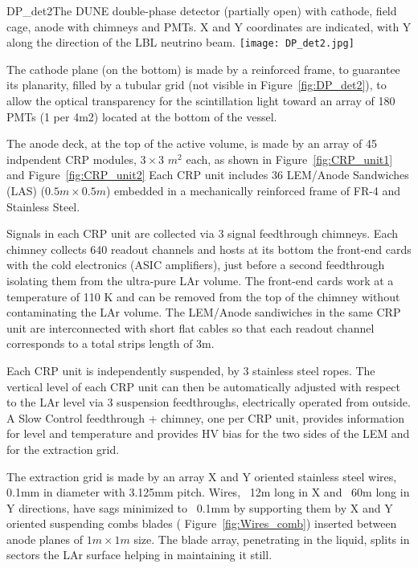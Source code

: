 \begin{cdrfigure}{DP_det2}{The DUNE double-phase detector (partially open) with cathode, field cage, anode with chimneys and PMTs. X and Y coordinates are indicated, with Y along the direction of the LBL neutrino beam.}
\texttt{[image: DP\_det2.jpg]}
\end{cdrfigure}

The cathode plane (on the bottom) is made by a reinforced frame, to guarantee its planarity, filled by a tubular grid (not visible in Figure~\ref{fig:DP_det2}), to allow the optical transparency for the scintillation light toward an array of 180 PMTs (1 per 4m2) located at the bottom of the vessel.

The anode deck, at the top of the active volume, is made by an array of 45 indpendent CRP modules, $3\times3$ $m^2$ each, as shown in Figure~\ref{fig:CRP_unit1} and Figure~\ref{fig:CRP_unit2} Each CRP unit includes 36 LEM/Anode Sandwiches (LAS) ($0.5m\times 0.5m$) embedded in  a mechanically reinforced frame of FR-4 and Stainless Steel. 

Signals in each CRP unit are collected via 3 signal feedthrough chimneys. Each chimney collects 640 readout channels and hosts at its bottom the front-end cards with the cold electronics (ASIC amplifiers), just before a second feedthrough isolating them from the ultra-pure LAr volume. The front-end cards work at a temperature of 110 K and can be removed from the top of the chimney without contaminating the LAr volume. The LEM/Anode sandiwiches in the same CRP unit are interconnected with short flat cables so that each readout channel corresponds to a total strips length of 3m.
  
Each CRP unit is independently suspended,  by 3 stainless steel ropes. The  vertical level of each CRP unit can then be automatically adjusted with respect to the LAr level via 3 suspension feedthroughs, electrically operated from outside. A Slow Control feedthrough + chimney, one per CRP unit, provides  information for level and temperature and provides HV bias for the two sides of the LEM  and for the extraction grid.

The extraction grid is made by an array X and Y oriented stainless steel wires, 0.1mm in diameter with 3.125mm pitch. 
Wires, ~12m long in X and ~60m long in Y directions, have sags minimized to ~0.1mm by supporting them by X and Y oriented suspending combs blades ( Figure~\ref{fig:Wires_comb}) inserted between anode planes of $1m \times 1m$ size. The blade array, penetrating in the liquid, splits in sectors the LAr surface helping in maintaining it still.

